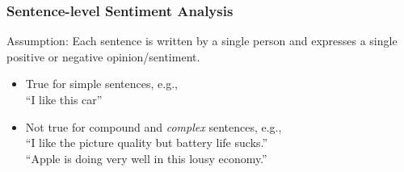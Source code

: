 \documentclass[t]{beamer}
\begin{document}
\begin{frame} \frametitle{Sentence-level Sentiment Analysis} %

\begin{block}{Assumption: }
Each sentence is written by a single person and expresses
a single positive or negative opinion/sentiment. 
\end{block}

\begin{itemize}
\item True for simple
sentences, e.g., \\
``I like this car''
\item Not true for compound and {\em complex} sentences, e.g., \\
``I like the picture quality but battery life sucks.'' \\
``Apple is doing very well in this lousy economy.''
\end{itemize}

\end{frame}


\end{document}

